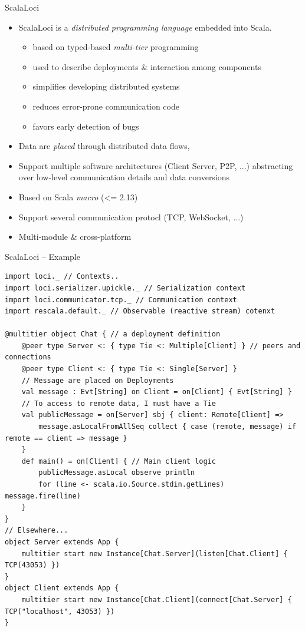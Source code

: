 \documentclass[presentation, 9pt]{beamer}\mode<presentation>{\usetheme{AMSBolognaFC}}
\begin{document}
\begin{frame}{ScalaLoci}
\begin{itemize}
	\item ScalaLoci is a \emph{distributed programming language} embedded into Scala. \href{https://github.com/scala-loci/scala-loci}{\faLink}
 	\begin{itemize}
		\item based on typed-based \emph{multi-tier} programming
  	\item used to describe deployments \& interaction among components
		 \item simplifies developing distributed systems
   	\item reduces error-prone communication code
    \item favors early detection of bugs
	 \end{itemize}
	 \item Data are \emph{placed} through distributed data flows, 
	 \item Support multiple software architectures (Client Server, P2P, ...) abstracting over low-level communication details and data conversions
	 \item Based on Scala \emph{macro} (<= 2.13)
   \item Support several communication protocl (TCP, WebSocket, ...)
   \item Multi-module \& cross-platform 
\end{itemize}
\end{frame}
\begin{frame}[fragile]{ScalaLoci -- Example}
	\begin{alertblock}{}
		\begin{tcolorbox}[left=0pt, top=0pt, bottom=0pt]
			\begin{verbatim}
import loci._ // Contexts..
import loci.serializer.upickle._ // Serialization context
import loci.communicator.tcp._ // Communication context
import rescala.default._ // Observable (reactive stream) cotenxt

@multitier object Chat { // a deployment definition
	@peer type Server <: { type Tie <: Multiple[Client] } // peers and connections
	@peer type Client <: { type Tie <: Single[Server] }
	// Message are placed on Deployments
	val message : Evt[String] on Client = on[Client] { Evt[String] }
	// To access to remote data, I must have a Tie
	val publicMessage = on[Server] sbj { client: Remote[Client] =>
		message.asLocalFromAllSeq collect { case (remote, message) if remote == client => message }
	}
	def main() = on[Client] { // Main client logic
		publicMessage.asLocal observe println
		for (line <- scala.io.Source.stdin.getLines) message.fire(line)
	}
}
// Elsewhere...
object Server extends App {
	multitier start new Instance[Chat.Server](listen[Chat.Client] { TCP(43053) })
}
object Client extends App {
	multitier start new Instance[Chat.Client](connect[Chat.Server] { TCP("localhost", 43053) })
}
			\end{verbatim}
		\end{tcolorbox}
	\end{alertblock}
\end{frame}
\end{document}
